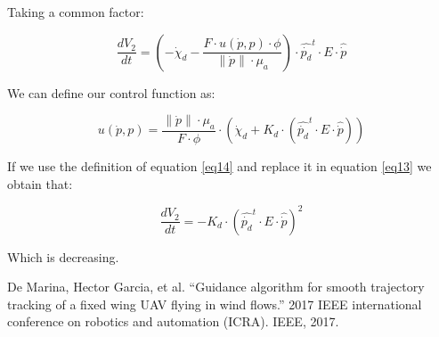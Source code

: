 \documentclass[conference]{IEEEtran}
\begin{document}
Taking a common factor:

\begin{equation}
\frac{dV_{2}}{dt}=(-\dot{\chi}_{d} -\frac{F\cdot u(\dot{p},p)\cdot \phi}{\lVert\dot{p}\rVert \cdot \mu_{a}})\cdot \hat{\dot{p_{d}}}^{t}\cdot E\cdot \hat{\dot{p}}
\end{equation} \label{eq13}

We can define our control function as:

\begin{equation}
 u(\dot{p},p)= \frac{\lVert\dot{p}\rVert \cdot \mu_{a}}{F\cdot \phi}\cdot (\dot{\chi}_{d}+K_{d}\cdot(\hat{\dot{p_{d}}}^{t}\cdot E\cdot \hat{\dot{p}}))
\end{equation} \label{eq14}

If we use the definition of equation \ref{eq14} and replace it in equation \ref{eq13} we obtain that:

\begin{equation}
\frac{dV_{2}}{dt}=- K_{d}\cdot(\hat{\dot{p_{d}}}^{t}\cdot E\cdot \hat{\dot{p}})^{2}
\end{equation} 


Which is decreasing.





\begin{thebibliography}{00}
 De Marina, Hector Garcia, et al. ``Guidance algorithm for smooth trajectory tracking of a fixed wing UAV flying in wind flows.'' 2017 IEEE international conference on robotics and automation (ICRA). IEEE, 2017.

\end{thebibliography}
\end{document}
